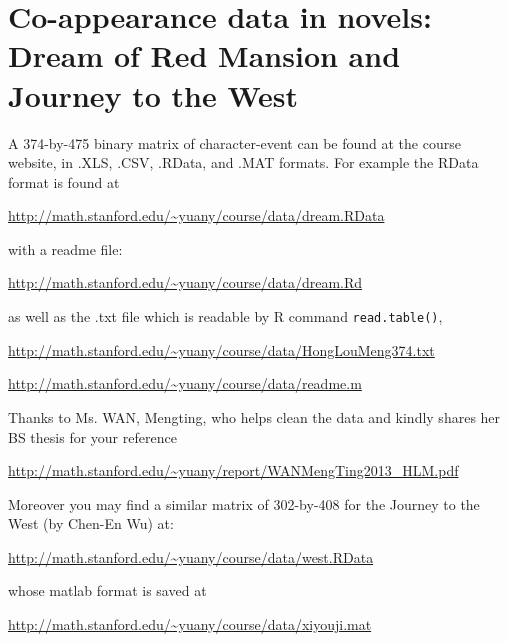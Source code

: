 \documentclass[11pt]{article}
\begin{document}
\section{Co-appearance data in novels: Dream of Red Mansion and Journey to the West}

A 374-by-475 binary matrix of character-event can be found at the course website, in .XLS, .CSV, .RData, and .MAT formats. For example the RData format is found at

\url{http://math.stanford.edu/~yuany/course/data/dream.RData} 

\noindent with a readme file:

\url{http://math.stanford.edu/~yuany/course/data/dream.Rd}

\noindent as well as the .txt file which is readable by R command {\tt read.table()},

\url{http://math.stanford.edu/~yuany/course/data/HongLouMeng374.txt}

\url{http://math.stanford.edu/~yuany/course/data/readme.m}

Thanks to Ms. WAN, Mengting, who helps clean the data and kindly shares her BS thesis for your reference
 
\url{http://math.stanford.edu/~yuany/report/WANMengTing2013_HLM.pdf}

%

Moreover you may find a similar matrix of 302-by-408 for the Journey to the West (by Chen-En Wu) at:

\url{http://math.stanford.edu/~yuany/course/data/west.RData}

\noindent whose matlab format is saved at

\url{http://math.stanford.edu/~yuany/course/data/xiyouji.mat}

\end{document}
